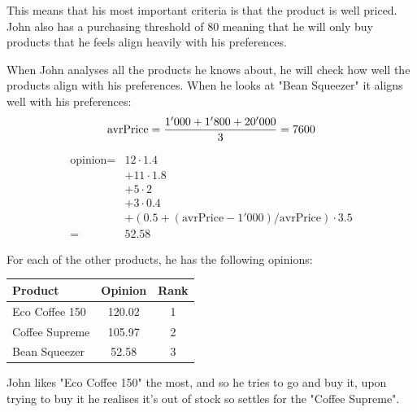 This means that his most important criteria is that the product is well priced. John also has a purchasing threshold of
80 meaning that he will only buy products that he feels align heavily with his preferences.

When John analyses all the products he knows about, he will check how well the products align with his preferences.
When he looks at "Bean Squeezer" it aligns well with his preferences:
$$
	\text{avrPrice} = \frac{1'000 + 1'800 + 20'000}{ 3 } = 7600 \\
$$

\begin{align}
	\text{opinion} = & 12 \cdot 1.4                                                   \\
	                 & + 11 \cdot 1.8                                                 \\
	                 & + 5 \cdot 2                                                    \\
	                 & + 3 \cdot 0.4                                                  \\
	                 & + (0.5 + (\text{avrPrice} - 1'000)/ \text{avrPrice}) \cdot 3.5 \\
	=                & 52.58
\end{align}

For each of the other products, he has the following opinions:

\begin{table}[h]
	\centering
	\begin{tabular}{l c c }
		\toprule
		Product        & Opinion & Rank \\ \midrule
		Eco Coffee 150 & 120.02  & 1    \\
		Coffee Supreme & 105.97  & 2    \\
		Bean Squeezer  & 52.58   & 3    \\ \bottomrule
	\end{tabular}
\end{table}

John likes "Eco Coffee 150" the most, and so he tries to go and buy it, upon trying to buy it he realises it's out of
stock so settles for the "Coffee Supreme".
